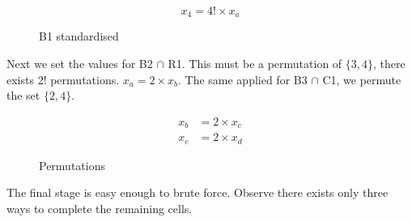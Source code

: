 \documentclass[a4paper,11pt]{report}
\newcounter{row}
\newcounter{col}
\newcounter{rowa}
\newcounter{cola}
\newcommand\setrowa[4]{
  \setcounter{cola}{1}
  \foreach \n in {#1, #2, #3, #4} {
    \edef\x{\value{cola} - 0.5}
    \edef\y{4.5 - \value{rowa}}
    \node[anchor=center] at (\x, \y) {\n};
    \stepcounter{cola}
  }
  \stepcounter{rowa}
}
\begin{document}
\begin{equation}
x_4 = 4!\times x_a
\end{equation}

\begin{figure}[h]
\centering
{}
\caption{B1 standardised}
\label{fig:shidokurelabelling}
\end{figure}

Next we set the values for B2 $\cap$ R1. This must be a permutation of $\{3,4\}$, there exists 2! permutations. $x_a = 2\times x_b$. The same applied for B3 $\cap$ C1, we permute the set $\{2,4\}$. 

\begin{eqnarray}x_b &= 2\times x_c\\ x_c &=2\times x_d\end{eqnarray}
\begin{figure}[h]
\centering
{}
\caption{Permutations}
\label{fig:shidokurelabelling}
\end{figure}

The final stage is easy enough to brute force. Observe there exists only three ways to complete the remaining cells.
\end{document}
